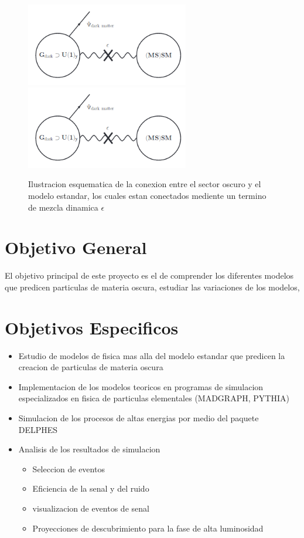 \begin{figure}
\begin{center}
  \includegraphics[width=2.8in]{sketch_darksector.png}
  \includegraphics[width=2.8in]{sketch_darksector.png}
  \caption{Ilustracion esquematica de la conexion entre el sector oscuro y el modelo estandar, los cuales estan conectados mediente un termino de mezcla dinamica $\epsilon$}
  \label{fig:AMS_positron}
\end{center}
\end{figure}


\chapter{Objetivo General}

El objetivo principal de este proyecto es el de comprender los diferentes modelos que predicen particulas de materia oscura, estudiar las variaciones de los modelos,  

\chapter{Objetivos Especificos}

\begin{itemize}
    \item Estudio de modelos de fisica mas alla del modelo estandar que predicen la creacion de particulas de materia oscura 
    \item Implementacion de los modelos teoricos en programas de simulacion especializados en fisica de particulas elementales (MADGRAPH, PYTHIA)
    \item Simulacion de los procesos de altas energias por medio del paquete DELPHES 
    \item Analisis de los resultados de simulacion
    \begin{itemize}
        \item Seleccion de eventos 
        \item Eficiencia de la senal y del ruido 
        \item visualizacion de eventos de senal 
        \item Proyecciones de descubrimiento para la fase de alta luminosidad 
    \end{itemize}
\end{itemize}

